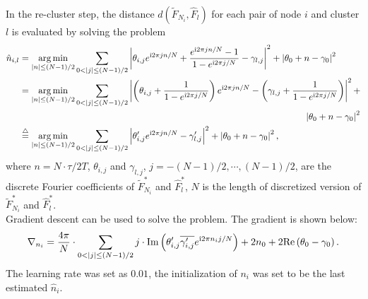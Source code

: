 		In the re-cluster step, the distance $d(\tilde F_{N_i}, \hat F_l)$ for each pair of node $i$ and cluster $l$ is evaluated by solving the problem
		\begin{equation}
		\begin{aligned}\label{eq:aligned distance}
		\hat n_{i,l}&=
		\underset{|n|\leq (N-1)/2}{\arg\min}
		\sum_{0<|j|\leq (N-1)/2}
		\left| \theta_{i,j}e^{\complexunit 2\pi j n/N}+
		\frac{e^{\complexunit{}2\pi j n/N}-1}{1-e^{\complexunit{}2\pi j /N}}
		-\gamma_{l,j} \right|^2
		+ \left| \theta_0+n-\gamma_0 \right|^2
		\\
		&=\underset{|n|\leq (N-1)/2}{\arg\min}
		\sum_{0<|j|\leq (N-1)/2}
		\left| \left( \theta_{i,j}+ \frac{1}{1-e^{\complexunit{}2\pi j /N}} \right) e^{\complexunit{}2\pi j n/N} 
		- \left( \gamma_{l,j}+\frac{1}{1-e^{\complexunit{}2\pi j /N}} \right)  \right|^2 
		+\\
		&\hspace{11cm} \left| \theta_0+n-\gamma_0 \right|^2
		\\
		&\overset{\triangle}{=}
		\underset{|n|\leq (N-1)/2}{\arg\min}\sum_{0<|j|\leq (N-1)/2}\left| \theta_{i,j}' e^{\complexunit{}2\pi j n/N} - {\gamma_{l,j}'}  \right|^2
		+ \left| \theta_0+n-\gamma_0 \right|^2
		,
		\end{aligned}
		\end{equation}
		where $n=N\cdot\tau/2T$,
		$\theta_{i,j}$ and $\gamma_{l,j}$,
		$j=  -(N-1)/2,\cdots,(N-1)/2 $, are the discrete Fourier coefficients of $\tilde F^*_{N_i}$ and $\hat F^*_l$,
		$N$ is the length of discretized version of $\tilde F^*_{N_i}$ and $\hat F^*_l$.
		\\
		Gradient descent can be used to solve the problem. 
		The gradient is shown below:
		\begin{equation}
		\begin{split}
		\nabla_{n_i} = \frac{4\pi}{N}\cdot 
		\sum_{0<|j|\leq (N-1)/2} j\cdot 
		\text{Im} \left( {\theta_{i,j}'}\overline{{\gamma_{i,j}'}}e^{\complexunit2\pi n_i j/N} \right) 
		+ 2n_0+2 \text{Re}\left( \theta_0-\gamma_0 \right) .
		\end{split}
		\end{equation}
		The learning rate was set as $0.01$, the initialization of $n_i$ was set to be the last estimated $\hat n_i$.
		


